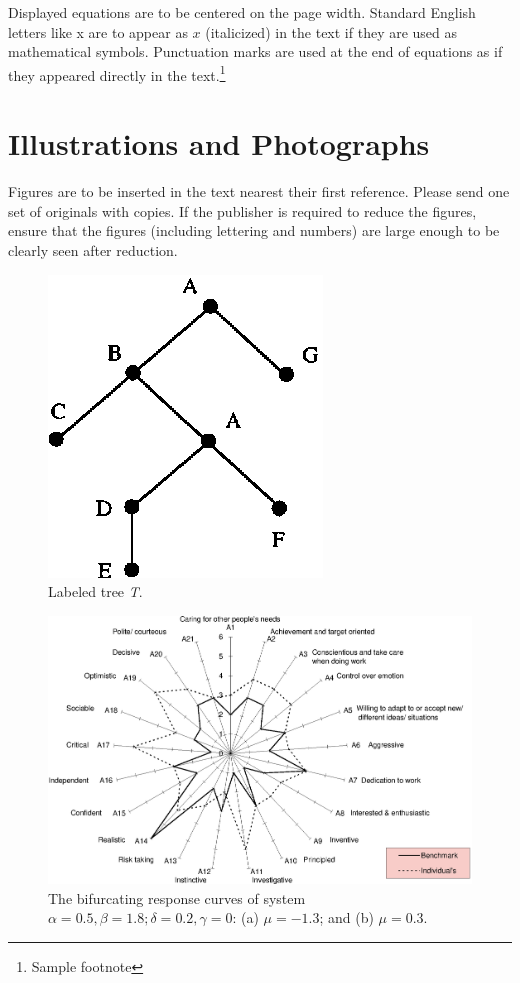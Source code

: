 \documentclass{ws-ijbc}
\begin{document}
Displayed equations are to be centered on the page width. Standard
English letters like x are to appear as $x$ (italicized) in the
text if they are used as mathematical symbols. Punctuation marks
are used at the end of equations as if they appeared directly in
the text.\footnote{Sample footnote}

\section{Illustrations and Photographs}
Figures are to be inserted in the text nearest their
first reference. Please send one set of originals with copies. If the
publisher is required to reduce the figures, ensure that the
figures (including lettering and numbers) are large enough to be
clearly seen after reduction.

\begin{figure}[h]
\begin{center}
\includegraphics{ijbcf1.eps}
\end{center}
\caption{Labeled tree {\it T}.}
\label{fig2}
\end{figure}

\begin{figure}
\begin{center}
\includegraphics[width=7in]{ijbcf2.eps}
\end{center}
\caption{The bifurcating response curves of system
$\alpha=0.5, \beta=1.8; \delta=0.2, \gamma=0$: (a)
$\mu=-1.3$; and (b) $\mu=0.3$.}
\label{fig1}
\end{figure}
\end{document}
